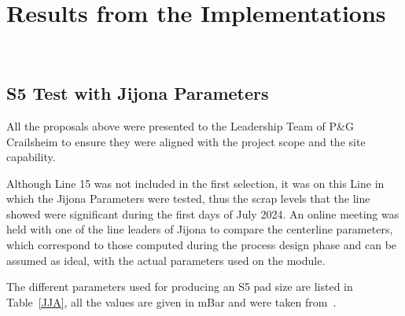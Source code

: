 \chapter{Results from the Implementations}~\label{Ch4}

\section{S5 Test with Jijona Parameters}
All the proposals above were presented to the Leadership Team of P\&G Crailsheim to ensure they were aligned with the project scope and the site capability. 

Although Line 15 was not included in the first selection, it was on this Line in which the Jijona Parameters were tested, thus the scrap levels that the line showed were significant during the first days of July 2024. An online meeting was held with one of the line leaders of Jijona to compare the centerline parameters, which correspond to those computed during the process design phase and can be assumed as ideal, with the actual parameters used on the module. 

The different parameters used for producing an S5 pad size are listed in Table~\ref{JJA}, all the values are given in mBar and were taken from~\cite{S5Center}. 

\begin{table}[H]
\centering
{}
\caption{STS C\&L S5 Presets Comparison~[Author].}
\label{JJA}
\end{table}

